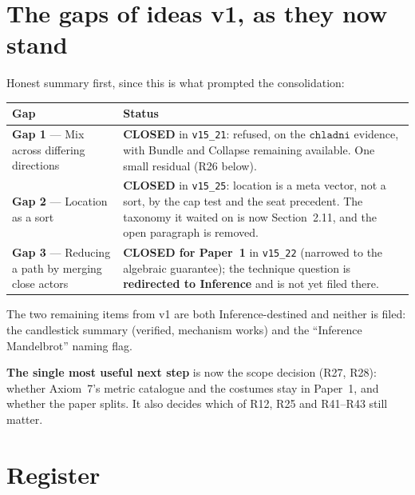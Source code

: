 \documentclass[11pt]{article}
\begin{document}
\section{The gaps of ideas v1, as they now stand}

Honest summary first, since this is what prompted the consolidation:

\begin{center}
\begin{tabular}{p{4.2cm}p{10.4cm}}
Gap & Status \\
\hline
\textbf{Gap 1} --- Mix across differing directions &
\textbf{CLOSED} in \texttt{v15\_21}: refused, on the $\mathtt{chladni}$
evidence, with Bundle and Collapse remaining available. One small
residual (R26 below). \\[4pt]
\textbf{Gap 2} --- Location as a sort &
\textbf{CLOSED} in \texttt{v15\_25}: location is a meta vector, not a
sort, by the cap test and the seat precedent. The taxonomy it waited on
is now Section~2.11, and the open paragraph is removed. \\[4pt]
\textbf{Gap 3} --- Reducing a path by merging close actors &
\textbf{CLOSED for Paper~1} in \texttt{v15\_22} (narrowed to the
algebraic guarantee); the technique question is \textbf{redirected to
Inference} and is not yet filed there. \\
\end{tabular}
\end{center}

The two remaining items from v1 are both Inference-destined and
neither is filed: the candlestick summary (verified, mechanism
works) and the ``Inference Mandelbrot'' naming flag.

\textbf{The single most useful next step} is now the scope decision
(R27, R28): whether Axiom~7's metric catalogue and the costumes stay in
Paper~1, and whether the paper splits. It also decides which of R12, R25
and R41--R43 still matter.

\section{Register}
\end{document}

